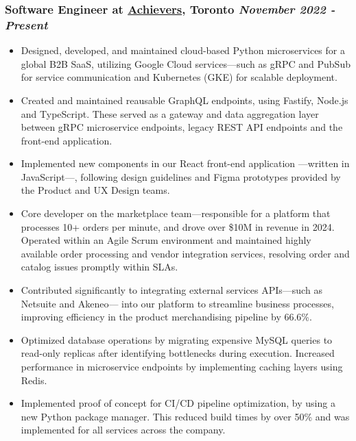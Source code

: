 \documentclass[a4paper,10pt]{article}
\begin{document}
\subsubsection*{%
  \textbf{Software Engineer} at \href{https://www.achievers.com/}{Achievers}, Toronto
  \hfill
  \textit{November 2022 - Present}
}
\begin{itemize}
  \item Designed, developed, and maintained cloud-based Python microservices for a global B2B SaaS, utilizing
  Google Cloud services---such as gRPC and PubSub for service communication and Kubernetes (GKE) for scalable deployment.
  \item Created and maintained reausable GraphQL endpoints, using Fastify, Node.js and TypeScript. These served as a gateway and data
  aggregation layer between gRPC microservice endpoints, legacy REST API endpoints and the front-end application.
  \item Implemented new components in our React front-end application ---written in JavaScript---,
  following design guidelines and Figma prototypes provided by the Product and UX Design teams.

  \item Core developer on the marketplace team---responsible for a platform that processes 10+ orders per minute, and drove over \$10M in
  revenue in 2024. Operated within an Agile Scrum environment and maintained highly available order processing and vendor integration
  services, resolving order and catalog issues promptly within SLAs.

  \item Contributed significantly to integrating external services APIs---such as Netsuite and Akeneo--- into our platform to streamline
  business processes, improving efficiency in the product merchandising pipeline by 66.6\%.

  \item Optimized database operations by migrating expensive MySQL queries to read-only replicas after identifying
  bottlenecks during execution. Increased performance in microservice endpoints by implementing caching layers
  using Redis.
  \item Implemented proof of concept for CI/CD pipeline optimization, by using a new Python package manager. This reduced build
  times by over 50\% and was implemented for all services across the company.
\end{itemize}
\end{document}
